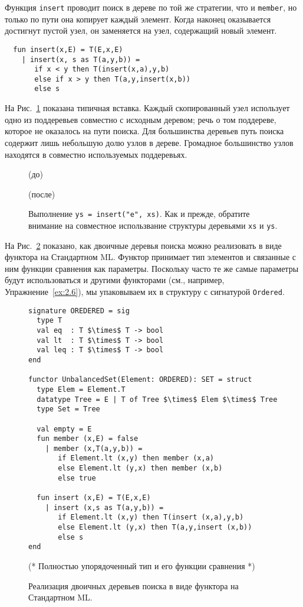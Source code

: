 Функция \lstinline!insert! проводит поиск в дереве по той же стратегии,
что и \lstinline!member!, но только по пути она копирует каждый
элемент. Когда наконец оказывается достигнут пустой узел, он
заменяется на узел, содержащий новый элемент.
\begin{lstlisting}
  fun insert(x,E) = T(E,x,E)
    | insert(x, s as T(a,y,b)) =
       if x < y then T(insert(x,a),y,b)
       else if x > y then T(a,y,insert(x,b))
       else s
\end{lstlisting}
На Рис.~\ref{fig:2.8} показана типичная вставка. Каждый скопированный
узел использует одно из поддеревьев совместно с исходным деревом; речь о том поддереве,
которое не оказалось на пути поиска. Для большинства деревьев путь
поиска содержит лишь небольшую долю узлов в дереве. Громадное
большинство узлов находятся в совместно используемых поддеревьях.

\begin{figure}[h]
  \centering
	\par
  (до)\par
	\vspace{0.5cm}
	\par
  (после)\par
	\vspace{0.5cm}
  \caption{Выполнение \lstinline!ys = insert("e", xs)!. Как и прежде,
    обратите внимание на совместное использвание структуры деревьями \lstinline!xs! и \lstinline!ys!.}
  \label{fig:2.8}
\end{figure}

На Рис.~\ref{fig:2.9} показано, как двоичные деревья поиска можно
реализовать в виде функтора на Стандартном ML. Функтор принимает тип
элементов и связанные с ним функции сравнения как параметры. Поскольку
часто те же самые параметры будут использоваться и другими функторами
(см., например, Упражнение~\ref{ex:2.6}), мы упаковываем их в
структуру с сигнатурой \lstinline!Ordered!.

\begin{figure}  
\begin{lstlisting}
signature OREDERED = sig
  type T
  val eq  : T $\times$ T -> bool
  val lt  : T $\times$ T -> bool
  val leq : T $\times$ T -> bool
end

functor UnbalancedSet(Element: ORDERED): SET = struct 
  type Elem = Element.T
  datatype Tree = E | T of Tree $\times$ Elem $\times$ Tree
  type Set = Tree
  
  val empty = E
  fun member (x,E) = false
    | member (x,T(a,y,b)) = 
       if Element.lt (x,y) then member (x,a)
       else Element.lt (y,x) then member (x,b)
       else true

  fun insert (x,E) = T(E,x,E)
    | insert (x,s as T(a,y,b)) = 
       if Element.lt (x,y) then T(insert (x,a),y,b)
       else Element.lt (y,x) then T(a,y,insert (x,b))
       else s 
end
\end{lstlisting}

  (* Полностью упорядоченный тип и его функции сравнения *)
  \caption{Реализация двоичных деревьев поиска в виде функтора на Стандартном ML.}
  \label{fig:2.9}
\end{figure}

